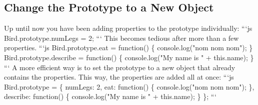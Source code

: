 \documentclass{article}%
\begin{document}
\subsection{Change the Prototype to a New Object}%
\label{subsec:ChangethePrototypetoaNewObject}%
Up until now you have been adding properties to the prototype individually:\newline%
```js\newline%
Bird.prototype.numLegs = 2;\newline%
```\newline%
This becomes tedious after more than a few properties.\newline%
```js\newline%
Bird.prototype.eat = function() \{\newline%
  console.log("nom nom nom");\newline%
\}\newline%
Bird.prototype.describe = function() \{\newline%
  console.log("My name is " + this.name);\newline%
\}\newline%
```\newline%
A more efficient way is to set the prototype to a new object that already contains the properties. This way, the properties are added all at once:\newline%
```js\newline%
Bird.prototype = \{\newline%
  numLegs: 2, \newline%
  eat: function() \{\newline%
    console.log("nom nom nom");\newline%
  \},\newline%
  describe: function() \{\newline%
    console.log("My name is " + this.name);\newline%
  \}\newline%
\};\newline%
```\newline%

%
\end{document}
